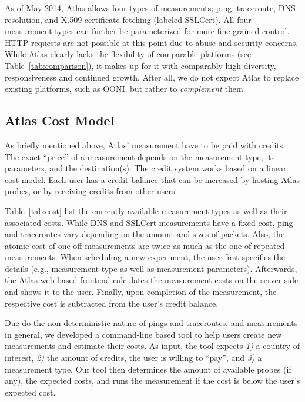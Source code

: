 As of May 2014, Atlas allows four types of measurements; ping, traceroute, DNS
resolution, and X.509 certificate fetching (labeled SSLCert).  All four measurement types can
further be parameterized for more fine-grained control.  HTTP requests are not
possible at this point due to abuse and security concerns.  While Atlas clearly lacks the
flexibility of comparable platforms (see Table~\ref{tab:comparison}), it makes
up for it with comparably high diversity, responsiveness and continued growth.  After all,
we do not expect Atlas to replace existing platforms, such as OONI, but rather to
\emph{complement} them.



\subsection{Atlas Cost Model}

As briefly mentioned above, Atlas' measurement have to be paid with credits.  The exact ``price'' of a measurement depends on the
measurement type, its parameters, and the destination(s).  The credit system
works based on a linear cost model.  Each user has a credit balance that can be
increased by hosting Atlas probes, or by receiving credits from other users.

Table~\ref{tab:cost} list the currently available measurement types as well as
their associated costs.  While DNS and SSLCert measurements have a fixed cost,
ping and traceroutes vary depending on the amount and sizes of packets.  Also,
the atomic cost of one-off measurements are twice as much as the one of repeated
measurements.  When scheduling a new experiment, the user first specifies the
details (e.g., measurement type as well as measurement parameters).  Afterwards, the
Atlas web-based frontend calculates the measurement costs on the server side and
shows it to the user.  Finally, upon completion of the measurement, the
respective cost is subtracted from the user's credit balance.

Due do the non-deterministic nature of pings and traceroutes, and measurements
in general, we developed a command-line based tool to help users create new
measurements and estimate their costs.  As input, the tool expects \emph{1)} a
country of interest, \emph{2)} the amount of credits, the user is willing to
``pay'', and \emph{3)} a measurement type.  Our tool then determines the amount
of available probes (if any), the expected costs, and runs the measurement if
the cost is below the user's expected cost.


